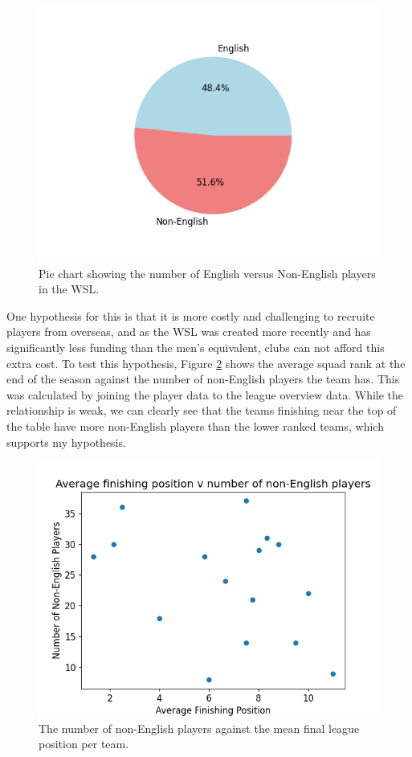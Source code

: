 \documentclass[12pt, a4paper, twocolumn]{article}
\begin{document}
\begin{figure}
  \includegraphics[width=\linewidth]{../vis/playerStats/nation_pie.png}
  \caption{Pie chart showing the number of English versus Non-English players in the WSL.}
  \label{nation_pie}
\end{figure}

One hypothesis for this is that it is more costly and challenging to recruite players from overseas, and as the WSL was created more recently and has significantly less funding than the men's equivalent, clubs can not afford this extra cost. To test this hypothesis, Figure \ref{nation_rank} shows the average squad rank at the end of the season against the number of non-English players the team has. This was calculated by joining the player data to the league overview data. While the relationship is weak, we can clearly see that the teams finishing near the top of the table have more non-English players than the lower ranked teams, which supports my hypothesis.

\begin{figure}
  \includegraphics[width=\linewidth]{../vis/playerStats/nation_rank.png}
  \caption{The number of non-English players against the mean final league position per team.}
  \label{nation_rank}
\end{figure}
\end{document}
